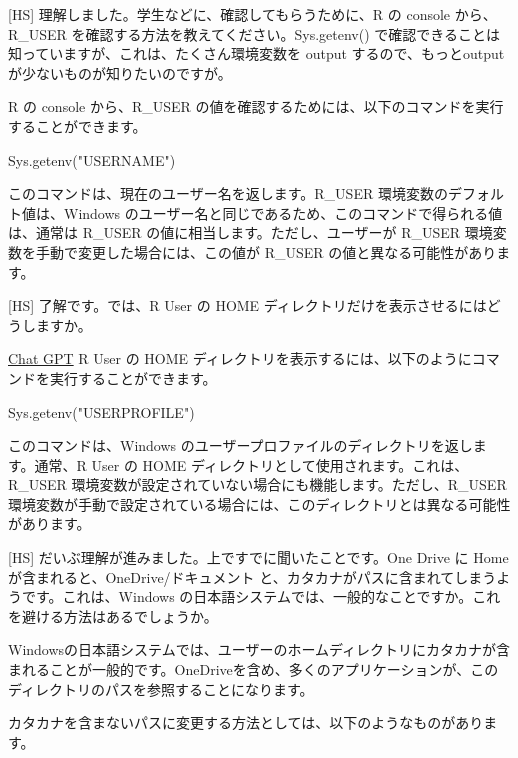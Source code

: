\documentclass[
]{bxjsbook}
\newenvironment{Shaded}{\begin{snugshade}}{\end{snugshade}}
\newcommand{\FunctionTok}[1]{\textcolor[rgb]{0.00,0.00,0.00}{#1}}
\newcommand{\NormalTok}[1]{#1}
\newcommand{\StringTok}[1]{\textcolor[rgb]{0.31,0.60,0.02}{#1}}
\theoremstyle{definition}
\theoremstyle{definition}
\theoremstyle{definition}
\theoremstyle{definition}
\theoremstyle{remark}
\begin{document}
{[}HS{]} 理解しました。学生などに、確認してもらうために、R の console から、R\_USER を確認する方法を教えてください。Sys.getenv() で確認できることは知っていますが、これは、たくさん環境変数を output するので、もっとoutput が少ないものが知りたいのですが。

R の console から、R\_USER の値を確認するためには、以下のコマンドを実行することができます。

\begin{Shaded}
\begin{Highlighting}[]
\FunctionTok{Sys.getenv}\NormalTok{(}\StringTok{"USERNAME"}\NormalTok{)}
\end{Highlighting}
\end{Shaded}

このコマンドは、現在のユーザー名を返します。R\_USER 環境変数のデフォルト値は、Windows のユーザー名と同じであるため、このコマンドで得られる値は、通常は R\_USER の値に相当します。ただし、ユーザーが R\_USER 環境変数を手動で変更した場合には、この値が R\_USER の値と異なる可能性があります。

{[}HS{]} 了解です。では、R User の HOME ディレクトリだけを表示させるにはどうしますか。

\protect\hyperlink{chatgpt}{Chat GPT} R User の HOME ディレクトリを表示するには、以下のようにコマンドを実行することができます。

\begin{Shaded}
\begin{Highlighting}[]
\FunctionTok{Sys.getenv}\NormalTok{(}\StringTok{"USERPROFILE"}\NormalTok{)}
\end{Highlighting}
\end{Shaded}

このコマンドは、Windows のユーザープロファイルのディレクトリを返します。通常、R User の HOME ディレクトリとして使用されます。これは、R\_USER 環境変数が設定されていない場合にも機能します。ただし、R\_USER 環境変数が手動で設定されている場合には、このディレクトリとは異なる可能性があります。

{[}HS{]} だいぶ理解が進みました。上ですでに聞いたことです。One Drive に Home が含まれると、OneDrive/ドキュメント と、カタカナがパスに含まれてしまうようです。これは、Windows の日本語システムでは、一般的なことですか。これを避ける方法はあるでしょうか。

Windowsの日本語システムでは、ユーザーのホームディレクトリにカタカナが含まれることが一般的です。OneDriveを含め、多くのアプリケーションが、このディレクトリのパスを参照することになります。

カタカナを含まないパスに変更する方法としては、以下のようなものがあります。
\end{document}
